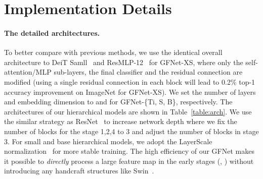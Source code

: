 \documentclass{article}
\numberwithin{equation}{section}
\begin{document}
\section{Implementation Details}\label{sec:train_details}

\paragraph{The detailed architectures.} To better compare with previous methods, we use the identical overall architecture to DeiT Samll~\cite{touvron2020deit} and ResMLP-12~\cite{touvron2021resmlp} for GFNet-XS, where only the self-attention/MLP sub-layers, the final classifier and the residual connection are modified (using a single residual connection in each block will lead to 0.2\% top-1 accuracy improvement on ImageNet for GFNet-XS).  We set the number of layers and embedding dimension to  and  for GFNet-\{Ti, S, B\}, respectively. The architectures of our hierarchical models are shown in Table~\ref{table:arch}. We use the similar strategy as ResNet~\cite{he2016deep} to increase network depth where we fix the number of blocks for the stage 1,2,4 to 3 and adjust the number of blocks in stage 3. For small and base hierarchical models, we adopt the LayerScale normalization~\cite{touvron2021going} for more stable training.  The high efficiency of our GFNet makes it possible to \emph{directly} process a large feature map in the early stages (\eg, ) without introducing any handcraft structures like Swin~\cite{liu2021swin}. 
\end{document}
